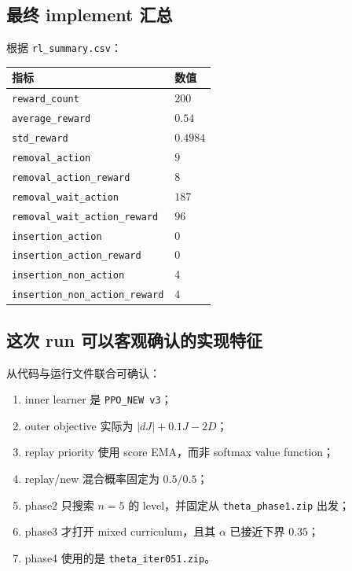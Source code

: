 \documentclass[11pt,a4paper]{ctexart}
\begin{document}
\subsection{最终 implement 汇总}
根据 \texttt{rl\_summary.csv}：
\begin{center}
\begin{tabular}{p{5.2cm}p{5.0cm}}
\toprule
指标 & 数值 \\
\midrule
\texttt{reward\_count} & \(200\) \\
\texttt{average\_reward} & \(0.54\) \\
\texttt{std\_reward} & \(0.4984\) \\
\texttt{removal\_action} & \(9\) \\
\texttt{removal\_action\_reward} & \(8\) \\
\texttt{removal\_wait\_action} & \(187\) \\
\texttt{removal\_wait\_action\_reward} & \(96\) \\
\texttt{insertion\_action} & \(0\) \\
\texttt{insertion\_action\_reward} & \(0\) \\
\texttt{insertion\_non\_action} & \(4\) \\
\texttt{insertion\_non\_action\_reward} & \(4\) \\
\bottomrule
\end{tabular}
\end{center}

\subsection{这次 run 可以客观确认的实现特征}
从代码与运行文件联合可确认：
\begin{enumerate}[leftmargin=2.2em,itemsep=0.25em]
    \item inner learner 是 \texttt{PPO\_NEW v3}；
    \item outer objective 实际为 \(|dJ| + 0.1J - 2D\)；
    \item replay priority 使用 score EMA，而非 softmax value function；
    \item replay/new 混合概率固定为 \(0.5/0.5\)；
    \item phase2 只搜索 \(n=5\) 的 level，并固定从 \texttt{theta\_phase1.zip} 出发；
    \item phase3 才打开 mixed curriculum，且其 \(\alpha\) 已接近下界 \(0.35\)；
    \item phase4 使用的是 \texttt{theta\_iter051.zip}。
\end{enumerate}
\end{document}
